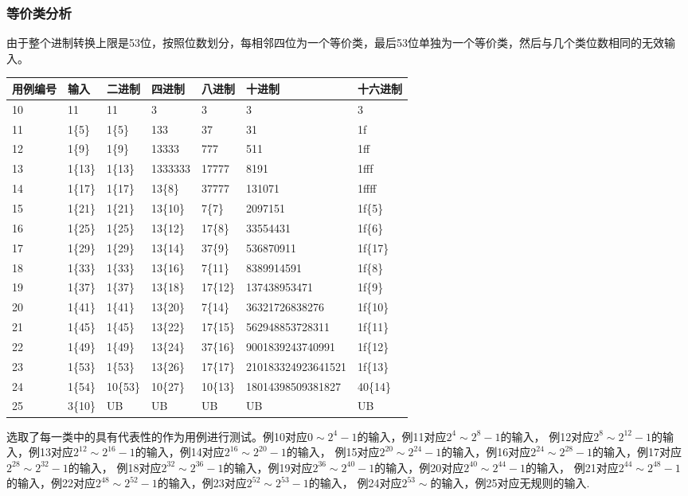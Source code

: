 \documentclass[12pt, a4paper, oneside]{ctexart}
\begin{document}
\newpage

\subsubsection{等价类分析}

由于整个进制转换上限是53位，按照位数划分，每相邻四位为一个等价类，最后53位单独为一个等价类，然后与几个类位数相同的无效输入。

\begin{table}[!h]
    \begin{tabular}{|l|l|l|l|l|l|l|}
    \hline
    用例编号 & 输入 & 二进制 & 四进制 & 八进制 & 十进制 & 十六进制 \\ \hline
    10 & 11 & 11 & 3 & 3 & 3 & 3 \\ \hline
    11 & 1\{5\} & 1\{5\} & 133 & 37 & 31 & 1f \\ \hline
    12 & 1\{9\} & 1\{9\} & 13333 & 777 & 511 & 1ff \\ \hline
    13 & 1\{13\} & 1\{13\} & 1333333 & 17777 & 8191 & 1fff \\ \hline
    14 & 1\{17\} & 1\{17\}& 13\{8\} & 37777 & 131071 & 1ffff \\ \hline
    15 & 1\{21\}& 1\{21\} & 13\{10\} & 7\{7\}& 2097151 & 1f\{5\} \\ \hline
    16 & 1\{25\} & 1\{25\}& 13\{12\} & 17\{8\} & 33554431 & 1f\{6\}\\ \hline
    17 & 1\{29\} & 1\{29\} & 13\{14\} & 37\{9\} & 536870911 &1f\{17\} \\ \hline
    18 & 1\{33\}& 1\{33\} & 13\{16\} &7\{11\} &8389914591 & 1f\{8\}\\ \hline
    19 & 1\{37\}& 1\{37\}&13\{18\} & 17\{12\} & 137438953471 & 1f\{9\}\\ \hline
    20 & 1\{41\}& 1\{41\} &13\{20\} &7\{14\} &  36321726838276 &1f\{10\} \\ \hline
    21 & 1\{45\}& 1\{45\} &13\{22\} & 17\{15\}& 562948853728311 &1f\{11\} \\ \hline
    22 & 1\{49\}& 1\{49\}&13\{24\} &37\{16\} &  9001839243740991 & 1f\{12\}\\ \hline
    23 & 1\{53\}& 1\{53\} &13\{26\} &17\{17\} &210183324923641521 &1f\{13\} \\ \hline
    24 & 1\{54\}& 10\{53\} & 10\{27\} &10\{13\} & 18014398509381827 &40\{14\} \\ \hline
    25 & 3\{10\}&UB &UB &UB &UB & UB\\ \hline
    \end{tabular}
\end{table}
    选取了每一类中的具有代表性的作为用例进行测试。例10对应$0\sim2^{4}-1$的输入，例11对应$2^{4}\sim2^{8}-1$的输入，
    例12对应$2^{8}\sim2^{12}-1$的输入，例13对应$2^{12}\sim2^{16}-1$的输入，例14对应$2^{16}\sim2^{20}-1$的输入，
    例15对应$2^{20}\sim2^{24}-1$的输入，例16对应$2^{24}\sim2^{28}-1$的输入，例17对应$2^{28}\sim2^{32}-1$的输入，
    例18对应$2^{32}\sim2^{36}-1$的输入，例19对应$2^{36}\sim2^{40}-1$的输入，例20对应$2^{40}\sim2^{44}-1$的输入，
    例21对应$2^{44}\sim2^{48}-1$的输入，例22对应$2^{48}\sim2^{52}-1$的输入，例23对应$2^{52}\sim2^{53}-1$的输入，
    例24对应$2^{53}\sim$的输入，例25对应无规则的输入.
\end{document}
